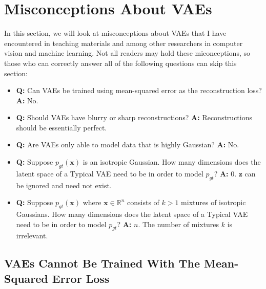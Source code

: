 \documentclass{article}
\begin{document}
\section{Misconceptions About VAEs}
\label{sec:misconceptions}
In this section, we will look at misconceptions about VAEs that I have encountered in teaching materials and among other researchers in computer vision and machine learning. Not all readers may hold these miconceptions, so those who can correctly answer all of the following questions can skip this section:
\begin{itemize}
    \item \textbf{Q:} Can VAEs be trained using mean-squared error as the reconstruction loss? \textbf{A:} No.
    \item \textbf{Q:} Should VAEs have blurry or sharp reconstructions? \textbf{A:} Reconstructions should be essentially perfect.
    \item \textbf{Q:} Are VAEs only able to model data that is highly Gaussian? \textbf{A:} No.
    \item \textbf{Q:} Suppose $p_{gt}(\mathbf{x})$ is an isotropic Gaussian. How many dimensions does the latent space of a Typical VAE  need to be in order to model $p_{gt}$? \textbf{A:} $0$. $\mathbf{z}$ can be ignored and need not exist.
    \item \textbf{Q:} Suppose $p_{gt}(\mathbf{x})$ where $\mathbf{x} \in \mathbb{R}^n$ consists of $k>1$ mixtures of isotropic Gaussians. How many dimensions does the latent space of a Typical VAE need to be in order to model $p_{gt}$? \textbf{A:} $n$. The number of mixtures $k$ is irrelevant.
\end{itemize}

\subsection{VAEs Cannot Be Trained With The Mean-Squared Error Loss}
\label{sec:mse}
\end{document}
